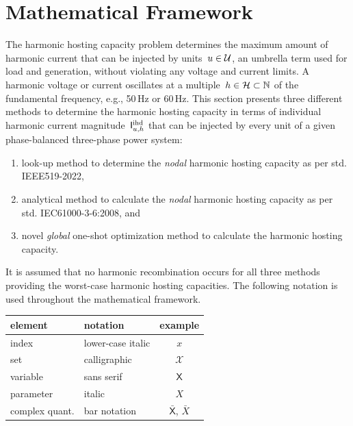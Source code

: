 \section{Mathematical Framework}
\label{sec:mathematical_framework}

The harmonic hosting capacity problem determines the maximum amount of harmonic current that can be injected by units~$u \in \mathcal{U}$, an umbrella term used for load and generation, without violating any voltage and current limits. A harmonic voltage or current oscillates at a multiple~$h \in \mathcal{H} \subset \mathbb{N}$ of the fundamental frequency, e.g., 50\,Hz or 60\,Hz. This section presents three different methods to determine the harmonic hosting capacity in terms of individual harmonic current magnitude~$\mathsf{I}^{\text{ihd}}_{u,h}$ that can be injected by every unit of a given phase-balanced three-phase power system:
\begin{enumerate}[leftmargin=3em]
    \item [\S\,\ref{sec:ieee519-2022}] look-up method to determine the \textit{nodal} harmonic hosting capacity as per std. IEEE519-2022,
    \item [\S\,\ref{sec:iec61000-3-6}] analytical method to calculate the \textit{nodal} harmonic hosting capacity as per std. IEC61000-3-6:2008, and
    \item [\S\,\ref{sec:optimization_method}] novel \textit{global} one-shot optimization method to calculate the harmonic hosting capacity. 
\end{enumerate}
It is assumed that no harmonic recombination occurs for all three methods providing the worst-case harmonic hosting capacities. The following notation is used throughout the mathematical framework.
\begin{table}[ht!]
    \centering
    \begin{tabular}{ l l c }
        element         & notation                  & example                           \\ \hline
        index           & lower-case italic         & $x$                               \\
        set             & calligraphic              & $\mathcal{X}$                     \\ 
        variable        & sans serif                & $\mathsf{X}$                      \\
        parameter       & italic                    & $X$                               \\
        complex quant.  & bar notation              & $\bar{\mathsf{X}}$, $\bar{X}$
    \end{tabular}
\end{table}

